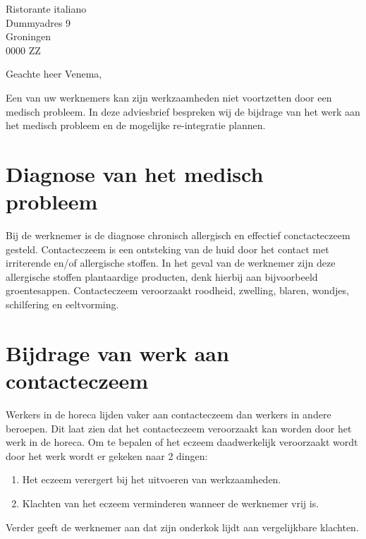 \documentclass[foldmarks=true,foldmarks=blmtP,fromphone,
fromemail,fromlogo,version=last,sections]{scrlttr2}
\begin{document}
\begin{letter}{%
	Ristorante italiano\\
	Dummyadres 9\\
	Groningen\\
	0000 ZZ%
}
\opening{Geachte heer Venema,}
Een van uw werknemers kan zijn werkzaamheden niet voortzetten door een medisch probleem. In deze adviesbrief bespreken wij de bijdrage van het werk aan het medisch probleem en de mogelijke re-integratie plannen.
\section{Diagnose van het medisch probleem}
Bij de werknemer is de diagnose chronisch allergisch en effectief conctacteczeem gesteld. Contacteczeem is een ontsteking van de huid door het contact met irriterende en/of allergische stoffen. In het geval van de werknemer zijn deze allergische stoffen plantaardige producten, denk hierbij aan bijvoorbeeld groentesappen. Contacteczeem veroorzaakt roodheid, zwelling, blaren, wondjes, schilfering en eeltvorming. 

\section{Bijdrage van werk aan contacteczeem}
Werkers in de horeca lijden vaker aan contacteczeem dan werkers in andere beroepen. Dit laat zien dat het contacteczeem veroorzaakt kan worden door het werk in de horeca. Om te bepalen of het eczeem daadwerkelijk veroorzaakt wordt door het werk wordt er gekeken naar 2 dingen:
\begin{enumerate}
    \item Het eczeem verergert bij het uitvoeren van werkzaamheden.
    \item Klachten van het eczeem verminderen wanneer de werknemer vrij is.
\end{enumerate}
Verder geeft de werknemer aan dat zijn onderkok lijdt aan vergelijkbare klachten.


\end{letter}
\end{document}
